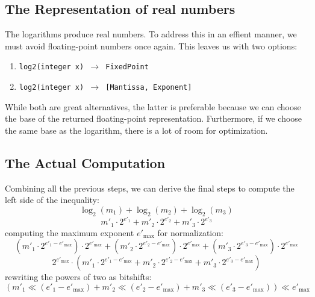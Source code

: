 \documentclass[11pt]{article}
\begin{document}
\subsection{The Representation of real numbers}
The logarithms produce real numbers. To address this in an effient manner, we must avoid floating-point numbers once again. This leaves us with two options:
\begin{enumerate}
  \item \texttt{log2(integer x) $\rightarrow$ FixedPoint}
  \item \texttt{log2(integer x) $\rightarrow$ [Mantissa, Exponent]}
\end{enumerate}
While both are great alternatives, the latter is preferable because we can choose the base of the returned floating-point representation. Furthermore, if we choose the same base as the logarithm, there is a lot of room for optimization.

\subsection{The Actual Computation}
Combining all the previous steps, we can derive the final steps to compute the left side of the inequality:
\setcounter{equation}{0}
\begin{equation}
    \log_2(m_1) + \log_2(m_2) + \log_2(m_3)
\end{equation}
\begin{equation}
    m'_1 \cdot 2^{e'_1} + m'_2 \cdot 2^{e'_2} + m'_3 \cdot 2^{e'_3}
\end{equation}
computing the maximum exponent $e'_{\max}$ for normalization:
\begin{equation}
    (m'_1 \cdot 2^{e'_1 - e'_{\max}}) \cdot 2^{e'_{\max}} + (m'_2 \cdot 2^{e'_2 - e'_{\max}}) \cdot 2^{e'_{\max}} + (m'_3 \cdot 2^{e'_3 - e'_{\max}}) \cdot 2^{e'_{\max}}
\end{equation} 
\begin{equation}
    2^{e'_{\max}} \cdot (m'_1 \cdot 2^{e'_1 - e'_{\max}} + m'_2 \cdot 2^{e'_2 - e'_{\max}} + m'_3 \cdot 2^{e'_3 - e'_{\max}})
\end{equation}
rewriting the powers of two as bitshifts:
\begin{equation}
    (m'_1 \ll (e'_1 - e'_{\max}) + m'_2 \ll (e'_2 - e'_{\max}) + m'_3 \ll (e'_3 - e'_{\max})) \ll e'_{\max}
\end{equation}



\end{document}
